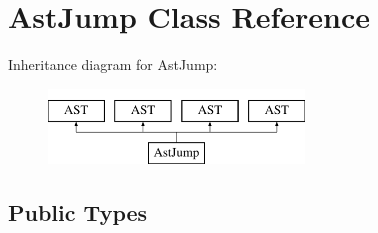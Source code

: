 \hypertarget{classAstJump}{\section{Ast\-Jump Class Reference}
\label{classAstJump}
}
Inheritance diagram for Ast\-Jump\-:\begin{figure}[H]
\begin{center}
\leavevmode
\includegraphics[height=2.000000cm]{classAstJump}
\end{center}
\end{figure}
\subsection*{Public Types}

